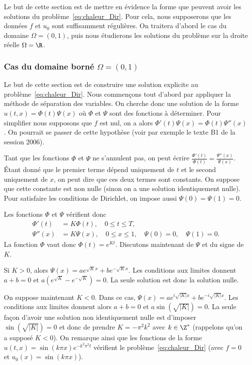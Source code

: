 \documentclass[12pt,a4paper,twoside]{article}
\begin{document}
Le but de cette section est de mettre en \'evidence la forme que peuvent avoir
les solutions du probl\`eme~\eqref{eq:chaleur_Dir}.
Pour cela, nous supposerons que les donn\'ees $f$ et $u_0$ sont suffisamment r\'eguli\`eres.
On traitera d'abord le cas du domaine $\Omega = (0,1)$, puis nous \'etudierons les solutions
du probl\`eme sur la droite r\'eelle $\Omega = \R$.

\subsubsection{Cas du domaine born\'e $\Omega = (0,1)$}
\label{subsubsec:chal_born}

Le but de cette section est de construire une solution explicite
au probl\`eme~\eqref{eq:chaleur_Dir}.
Nous commen\c{c}ons tout d'abord par appliquer la m\'ethode de s\'eparation des variables.
On cherche donc une solution de la forme
$u(t,x) = \Phi(t) \Psi(x)$ o\`u $\Phi$ et $\Psi$ sont des fonctions \`a d\'eterminer.
Pour simplifier nous supposons que $f$ est nul, on a alors $\Phi'(t) \Psi(x) = \Phi(t) \Psi''(x)$.
On pourrait se passer de cette hypoth\`ese (voir par exemple le texte B1 de la session 2006).


Tant que les fonctions $\Phi$ et $\Psi$ ne s'annulent pas, on peut \'ecrire
$\frac{\Phi'(t)}{\Phi(t)} = \frac{\Psi''(x)}{\Psi(x)}$.
\'Etant donn\'e que le premier terme d\'epend uniquement de $t$
et le second uniquement de $x$, on peut dire que ces deux termes sont constants.
On suppose que cette constante est non nulle (sinon on a une solution
identiquement nulle).
Pour satisfaire les conditions de Dirichlet, on impose aussi $\Psi(0) = \Psi(1) = 0$.


Les fonctions $\Phi$ et $\Psi$ v\'erifient donc
\begin{align*}
  \Phi'(t)
  &= K \Phi(t) , \quad 0 \leq t \leq T,
  \\
  \Psi''(x)
  &= K \Psi(x) , \quad 0 \leq x \leq 1, \quad
  \Psi(0)
  = 0 , \quad
  \Psi(1)
  = 0 .
\end{align*}
La fonction $\Phi$ vaut donc $\Phi(t) = e^{K t}$. Discutons maintenant de $\Psi$ et du signe de $K$.

Si $K>0$, alors $\Psi(x) = a e^{\sqrt{K} x} + b e^{- \sqrt{K} x}$.
Les conditions aux limites donnent
$a+b=0$ et $a(e^{\sqrt{K}} - e^{-\sqrt{K}}) = 0$.
La seule solution est donc la solution nulle.


On suppose maintenant $K < 0$.
Dans ce cas, $\Psi(x) = a e^{i\sqrt{|K|} x} + b e^{- i\sqrt{|K|} x}$.
Les conditions aux limites donnent alors $a + b = 0$
et $a \sin(\sqrt{|K|}) = 0$.
La seule fa\c{c}on d'avoir une solution non identiquement nulle
est d'imposer $\sin(\sqrt{|K|}) = 0$ et donc de prendre $K = - \pi^2 k^2$ avec $k \in \Z^*$
(rappelons qu'on a suppos\'e $K<0$).
On remarque ainsi
que les fonctions de la forme $u(t,x) = \sin(k \pi x) e^{-k^2 \pi^2 t}$
v\'erifient le probl\`eme~\eqref{eq:chaleur_Dir} (avec $f = 0$ et $u_0(x) = \sin(k \pi x)$).
\end{document}
